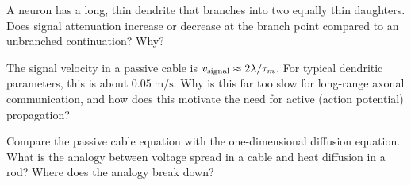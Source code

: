 \begin{conceptquestions}
  \item A neuron has a long, thin dendrite that branches into two equally thin daughters. Does signal attenuation increase or decrease at the branch point compared to an unbranched continuation? Why?

  \item The signal velocity in a passive cable is $v_{\text{signal}} \approx 2\lambda/\tau_m$. For typical dendritic parameters, this is about $0.05\;\text{m/s}$. Why is this far too slow for long-range axonal communication, and how does this motivate the need for active (action potential) propagation?

  \item Compare the passive cable equation with the one-dimensional diffusion equation. What is the analogy between voltage spread in a cable and heat diffusion in a rod? Where does the analogy break down?
\end{conceptquestions}
